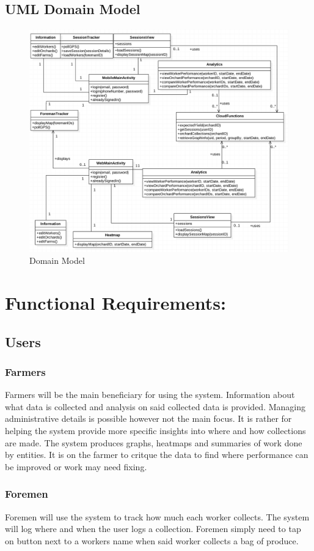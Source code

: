 \documentclass[11pt]{article}
\begin{document}
\newpage
\subsection{UML Domain Model}
\begin{figure}[h]
 \centering
 \includegraphics[width=12cm, keepaspectratio]{UMLClassDiag.png}
 \caption{Domain Model}
 \label{DomainModel}
\end{figure}

\section{Functional Requirements:}
\subsection{Users}
\subsubsection{Farmers}
Farmers will be the main beneficiary for using the system. Information about what data is collected and analysis on said collected data is provided. Managing administrative details is possible however not the main focus. It is rather for helping the system provide more specific insights into where and how collections are made. The system produces graphs, heatmaps and summaries of work done by entities. It is on the farmer to critque the data to find where performance can be improved or work may need fixing.

\subsubsection{Foremen}
Foremen will use the system to track how much each worker collects. The system will log where and when the user logs a collection. Foremen simply need to tap on button next to a workers name when said worker collects a bag of produce.
\end{document}
